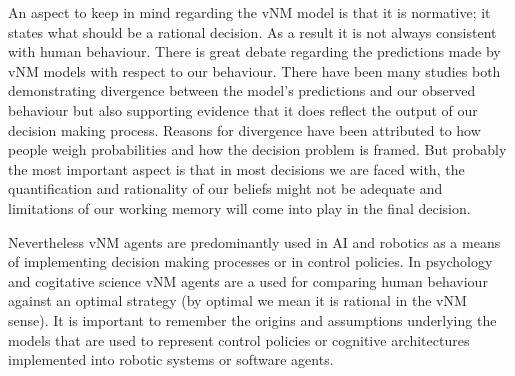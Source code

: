 An aspect to keep in mind regarding the vNM model is that it is normative; it states what should be a rational decision. 
As a result it is not always consistent with human behaviour. There is great debate regarding 
the predictions made by vNM models with respect to our behaviour. There have been many studies both demonstrating divergence 
between the model's predictions and our observed behaviour but also supporting evidence that it does reflect 
the output of our decision making process. Reasons for divergence have been attributed to how people
weigh probabilities and how the decision problem is framed. But probably the most important aspect is that 
in most decisions we are faced with, the quantification and rationality of our beliefs might not be adequate
and limitations of our working memory will come into play in the final decision.

Nevertheless vNM agents are predominantly used in AI and robotics as a means of implementing 
decision making processes or in control policies. In psychology and cogitative science vNM agents
are a used for comparing human behaviour against an optimal strategy (by optimal we mean it is rational in 
the vNM sense). It is important to remember the origins and assumptions underlying the models that 
are used to represent control policies or cognitive architectures implemented into robotic systems or 
software agents.


